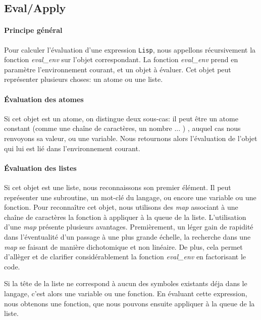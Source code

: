 \subsection{Eval/Apply}

\paragraph{Principe général}

Pour calculer l'évaluation d'une expression \texttt{Lisp}, nous appellons
récursivement la fonction \emph{eval\_env} sur l'objet correspondant.
La fonction \emph{eval\_env} prend en paramètre l'environnement
courant, et un objet à évaluer. Cet objet peut représenter plusieurs
choses: un atome ou une liste.

\paragraph{Évaluation des atomes}

Si cet objet est un atome, on distingue deux sous-cas: il peut être un
atome constant (comme une chaîne de caractères, un nombre ... ) , auquel
cas nous renvoyons sa valeur, ou une variable. Nous retournons
alors l'évaluation de l'objet qui lui est lié dans l'environnement
courant.

\paragraph{Évaluation des listes}

Si cet objet est une liste, nous reconnaissons son premier élément. Il
peut représenter une subroutine, un mot-clé du langage, ou encore une
variable ou une fonction. Pour reconnaître cet objet, nous utilisons
des \emph{map} associant à une chaîne de caractères la fonction à appliquer à
la queue de la liste. L'utilisation d'une \emph{map} présente plusieurs
avantages. Premièrement, un léger gain de rapidité dans l'éventualité
d'un passage à une plus grande échelle, la recherche dans une \emph{map} se
faisant de manière dichotomique et non linéaire. De plus, cela permet
d'allèger et de clarifier considérablement la fonction
\emph{eval\_env} en factorisant le code. 

Si la tête de la liste ne correspond à aucun des symboles existants
déja dans le langage, c'est alors une variable ou une fonction. En
évaluant cette expression, nous obtenons une fonction, que nous
pouvons ensuite appliquer à la queue de la liste.

